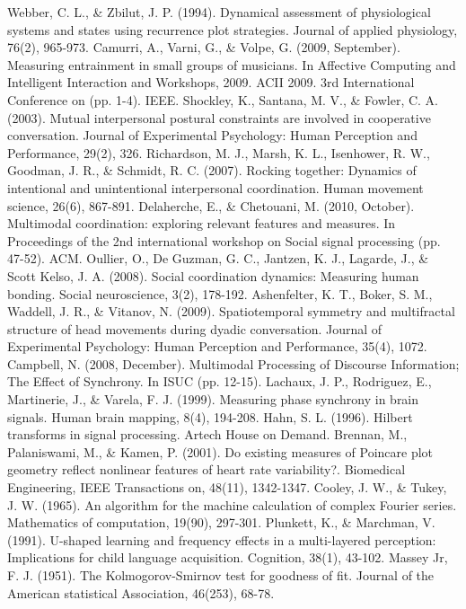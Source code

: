 \documentclass[12pt]{article}
\begin{document}
\begin{thebibliography}{}
    Webber, C. L., \& Zbilut, J. P. (1994). Dynamical assessment of physiological systems and states using recurrence plot strategies. Journal of applied physiology, 76(2), 965-973.
    Camurri, A., Varni, G., \& Volpe, G. (2009, September). Measuring entrainment in small groups of musicians. In Affective Computing and Intelligent Interaction and Workshops, 2009. ACII 2009. 3rd International Conference on (pp. 1-4). IEEE.
    Shockley, K., Santana, M. V., \& Fowler, C. A. (2003). Mutual interpersonal postural constraints are involved in cooperative conversation. Journal of Experimental Psychology: Human Perception and Performance, 29(2), 326.
    Richardson, M. J., Marsh, K. L., Isenhower, R. W., Goodman, J. R., \& Schmidt, R. C. (2007). Rocking together: Dynamics of intentional and unintentional interpersonal coordination. Human movement science, 26(6), 867-891.
    Delaherche, E., \& Chetouani, M. (2010, October). Multimodal coordination: exploring relevant features and measures. In Proceedings of the 2nd international workshop on Social signal processing (pp. 47-52). ACM.
    Oullier, O., De Guzman, G. C., Jantzen, K. J., Lagarde, J., \& Scott Kelso, J. A. (2008). Social coordination dynamics: Measuring human bonding. Social neuroscience, 3(2), 178-192.
    Ashenfelter, K. T., Boker, S. M., Waddell, J. R., \& Vitanov, N. (2009). Spatiotemporal symmetry and multifractal structure of head movements during dyadic conversation. Journal of Experimental Psychology: Human Perception and Performance, 35(4), 1072.
    Campbell, N. (2008, December). Multimodal Processing of Discourse Information; The Effect of Synchrony. In ISUC (pp. 12-15).
    Lachaux, J. P., Rodriguez, E., Martinerie, J., \& Varela, F. J. (1999). Measuring phase synchrony in brain signals. Human brain mapping, 8(4), 194-208.
    Hahn, S. L. (1996). Hilbert transforms in signal processing. Artech House on Demand.
    Brennan, M., Palaniswami, M., \& Kamen, P. (2001). Do existing measures of Poincare plot geometry reflect nonlinear features of heart rate variability?. Biomedical Engineering, IEEE Transactions on, 48(11), 1342-1347.
    Cooley, J. W., \& Tukey, J. W. (1965). An algorithm for the machine calculation of complex Fourier series. Mathematics of computation, 19(90), 297-301.
    Plunkett, K., \& Marchman, V. (1991). U-shaped learning and frequency effects in a multi-layered perception: Implications for child language acquisition. Cognition, 38(1), 43-102.
    Massey Jr, F. J. (1951). The Kolmogorov-Smirnov test for goodness of fit. Journal of the American statistical Association, 46(253), 68-78.
\end{thebibliography}
\end{document}
